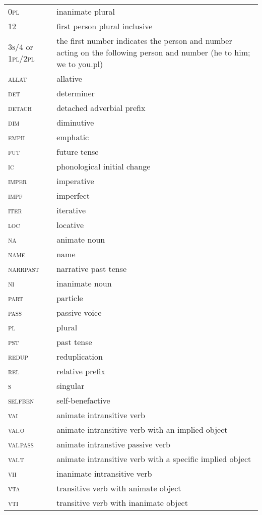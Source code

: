 \documentclass[11pt]{article}
\begin{document}
\begin{table}[ht]
\centering \small
\begin{tabular}{l p{2.3in}}
\textsc{0pl} & inanimate plural\\
12 & first person plural inclusive\\
\textsc{3s/4} or \textsc{1pl/2pl} & the first number indicates the person and number acting on the following person and number (he to him; we to you.pl)\\
\textsc{allat} & allative\\
\textsc{det} & determiner\\
\textsc{detach} &	detached adverbial prefix\\
\textsc{dim} &	diminutive\\
\textsc{emph} & emphatic\\
\textsc{fut} &	future tense\\
\textsc{ic} &	phonological initial change\\
\textsc{imper} & imperative\\
\textsc{impf} &	imperfect\\
\textsc{iter} & iterative\\
\textsc{loc} &	locative\\
\textsc{na} &	animate noun\\
\textsc{name} &	name\\
\textsc{narrpast} &	narrative past tense\\
\textsc{ni} &	inanimate noun\\
\textsc{part} &	particle\\
\textsc{pass} &	passive voice\\
\textsc{pl} &	plural\\
\textsc{pst} &	past tense\\
\textsc{redup} &	reduplication\\
\textsc{rel} &	relative prefix\\
\textsc{s} &	singular\\
\textsc{selfben} &	self-benefactive\\
\textsc{vai} &	animate intransitive verb\\
\textsc{vai.o} &	animate intransitive verb with an implied object\\
\textsc{vai.pass} &	animate intranstive passive verb\\
\textsc{vai.t} &	animate intransitive verb with a specific implied object\\
\textsc{vii} &	inanimate intransitive verb\\
\textsc{vta} &	transitive verb with animate object\\
\textsc{vti} &	transitive verb with inanimate object\\
\end{tabular}
\end{table}

\normalsize


\end{document}
